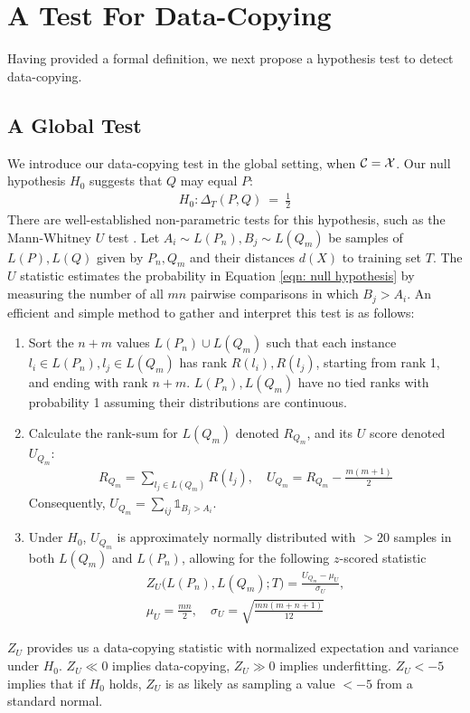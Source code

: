 \section{A Test For Data-Copying}

Having provided a formal definition, we next propose a hypothesis test to detect data-copying.

\subsection{A Global Test}
\label{sec:simple-global-test}
We introduce our data-copying test in the global setting, when $\mathcal{C} = \mathcal{X}$. Our null hypothesis $H_0$ suggests that $Q$ may equal $P$: 
\begin{align}
    \label{eqn: null hypothesis}
     H_0: \Delta_T(P,Q) \ = \ \frac{1}{2}
\end{align}
There are well-established non-parametric tests for this hypothesis, such as the Mann-Whitney $U$ test \citep{mannwhitney}. Let $A_i \sim L(P_n), B_j \sim L(Q_m)$ be samples of $L(P), L(Q)$ given by $P_n, Q_m$ and their distances $d(X)$ to training set $T$. The $U$ statistic estimates the probability in Equation \ref{eqn: null hypothesis} by measuring the number of all $mn$ pairwise comparisons in which $B_j > A_i$. An efficient and simple method to gather and interpret this test is as follows: 
\begin{enumerate}
    \item Sort the $n+m$ values $L(P_n) \cup L(Q_m)$ such that each instance $l_i \in L(P_n), l_j \in L(Q_m)$ has rank $R(l_i), R(l_j)$, starting from rank 1, and ending with rank $n+m$. $L(P_n), L(Q_m)$ have no tied ranks with probability 1 assuming their distributions are continuous.
    \item Calculate the rank-sum for $L(Q_m)$ denoted $R_{Q_m}$, and its $U$ score denoted $U_{Q_m}$:  
    \begin{align*}
       R_{Q_m} = \sum_{l_j \in L(Q_m)} R(l_j), \quad 
       U_{Q_m} = R_{Q_m} - \frac{m(m+1)}{2}
    \end{align*}
    Consequently, $U_{Q_m} = \sum_{ij} \mathds{1}_{B_j > A_i}$. 
    \item Under $H_0$, $U_{Q_m}$ is approximately normally distributed with $>20$ samples in both $L(Q_m)$ and $L(P_n)$, allowing for the following $z$-scored statistic
    \begin{align*}
        Z_U\big(L(P_n), L(Q_m);T\big) = \frac{U_{Q_m} - \mu_U}{\sigma_U}, \\
        \mu_U = \frac{mn}{2}, \quad
        \sigma_U = \sqrt{\frac{mn(m + n + 1)}{12}}
    \end{align*}
\end{enumerate}
$Z_U$ provides us a data-copying statistic with normalized expectation and variance under $H_0$. $Z_U \ll 0$ implies data-copying, $Z_U \gg 0$ implies underfitting. $Z_U < -5$ implies that if $H_0$ holds, $Z_U$ is as likely as sampling a value $< -5$ from a standard normal.

